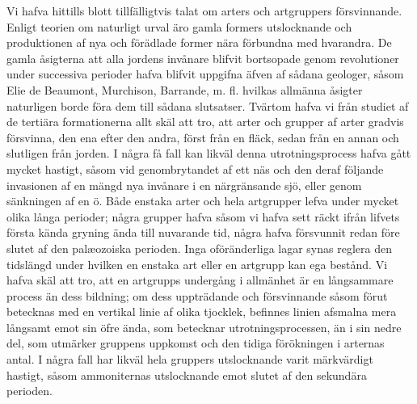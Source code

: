 Vi hafva hittills blott tillfälligtvis talat om arters och artgruppers försvinnande. Enligt teorien om naturligt urval äro gamla formers utslocknande och produktionen af nya och förädlade former nära förbundna med hvarandra. De gamla åsigterna att alla jordens invånare blifvit bortsopade genom revolutioner under successiva perioder hafva blifvit uppgifna äfven af sådana geologer, såsom Elie de Beaumont, Murchison, Barrande, m. fl. hvilkas allmänna åsigter naturligen borde föra dem till sådana slutsatser. Tvärtom hafva vi från studiet af de tertiära formationerna allt skäl att tro, att arter och grupper af arter gradvis försvinna, den ena efter den andra, först från en fläck, sedan från en annan och slutligen från jorden. I några få fall kan likväl denna utrotningsprocess hafva gått mycket hastigt, såsom vid genombrytandet af ett näs och den deraf följande invasionen af en mängd nya invånare i en närgränsande sjö, eller genom sänkningen af en ö. Både enstaka arter och hela artgrupper lefva under mycket olika långa perioder; några grupper hafva såsom vi hafva sett räckt ifrån lifvets första kända gryning ända till nuvarande tid, några hafva försvunnit redan före slutet af den palæozoiska perioden. Inga oföränderliga lagar synas reglera den tidslängd under hvilken en enstaka art eller en artgrupp kan ega bestånd. Vi hafva skäl att tro, att en artgrupps undergång i allmänhet är en långsammare process än dess bildning; om dess uppträdande och försvinnande såsom förut betecknas med en vertikal linie af olika tjocklek, befinnes linien afsmalna mera långsamt emot sin öfre ända, som betecknar utrotningsprocessen, än i sin nedre del, som utmärker gruppens uppkomst och den tidiga förökningen i arternas antal. I några fall har likväl hela gruppers utslocknande varit märkvärdigt hastigt, såsom ammoniternas utslocknande emot slutet af den sekundära perioden.

